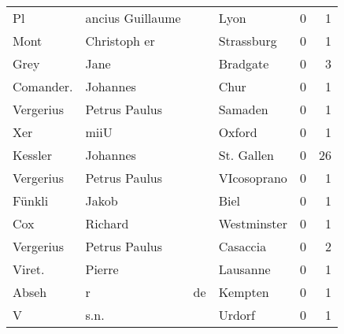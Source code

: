 \begin{center}
\begin{tiny}
\begin{longtabu}{llllrr}
                       Pl &                   ancius Guillaume &             &                                        Lyon &          0 &         1 \\
                     Mont &                       Christoph er &             &                                  Strassburg &          0 &         1 \\
                     Grey &                               Jane &             &                                    Bradgate &          0 &         3 \\
                Comander. &                           Johannes &             &                                        Chur &          0 &         1 \\
                Vergerius &                      Petrus Paulus &             &                                     Samaden &          0 &         1 \\
                      Xer &                               miiU &             &                                      Oxford &          0 &         1 \\
                  Kessler &                           Johannes &             &                                  St. Gallen &          0 &        26 \\
                Vergerius &                      Petrus Paulus &             &                                 VIcosoprano &          0 &         1 \\
                   Fünkli &                              Jakob &             &                                        Biel &          0 &         1 \\
                      Cox &                            Richard &             &                                 Westminster &          0 &         1 \\
                Vergerius &                      Petrus Paulus &             &                                    Casaccia &          0 &         2 \\
                   Viret. &                             Pierre &             &                                    Lausanne &          0 &         1 \\
                    Abseh &                                  r &          de &                                     Kempten &          0 &         1 \\
                        V &                               s.n. &             &                                      Urdorf &          0 &         1 \\

\end{longtabu}
\end{tiny}
\end{center}
